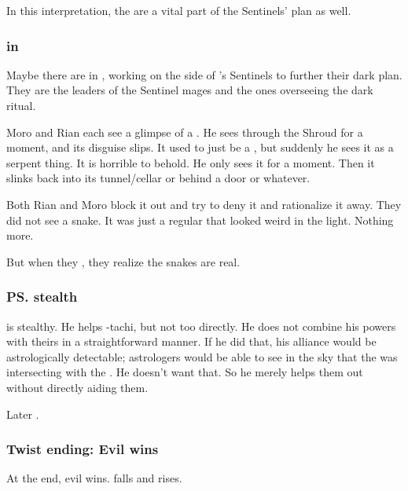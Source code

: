 In this interpretation, the \noggyaleth{} are a vital part of the Sentinels' plan as well.





\subsubsection{\QuilJaaran in \Malcur}
Maybe there are \quiljaaran in \Malcur, working on the side of \Secherdamon's Sentinels to further their dark plan.
They are the leaders of the Sentinel mages and the ones overseeing the dark ritual. 

Moro and Rian each see a glimpse of a \quiljaaran.
He sees through the Shroud for a moment, and its disguise slips. 
It used to just be a \scatha, but suddenly he sees it as a serpent thing. 
It is horrible to behold. 
He only sees it for a moment.
Then it slinks back into its tunnel/cellar or behind a door or whatever. 

Both Rian and Moro block it out and try to deny it and rationalize it away.
They did not see a snake.
It was just a regular \scatha that looked weird in the light. 
Nothing more. 

But when they , they realize the snakes are real.





\subsubsection[Ishnaruchaefir's stealth]{\ps{\Ishnaruchaefir} stealth}
\Ishnaruchaefir{} is stealthy. 
He helps \Secherdamon-tachi, but not too directly. 
He does not combine his powers with theirs in a straightforward manner. 
If he did that, his alliance would be astrologically detectable; astrologers would be able to see in the sky that the  was intersecting with the . 
He doesn't want that. 
So he merely helps them out without directly aiding them. 

Later . 





\subsubsection{Twist ending: Evil wins}
At the end, evil wins. 
\Malcur falls and \Nithdornazsh{} rises. 

